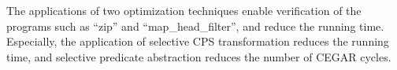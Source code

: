 The applications of two optimization techniques enable verification of the
programs such as ``zip'' and ``map\_head\_filter'', and reduce the
running time.  Especially, the application of selective CPS
transformation reduces the running time, and selective predicate
abstraction reduces the number of CEGAR cycles.

%
%
%
%
%
%
%
%
%
%
%
%
%
%
%
%
%
%
